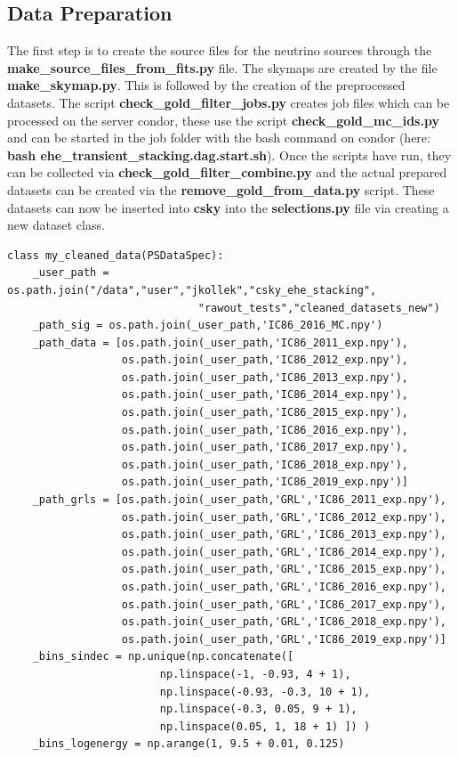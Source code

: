 \subsection{Data Preparation}
The first step is to create the source files for the neutrino sources through the \textbf{make\_source\_files\_from\_fits.py} file.
The skymaps are created by the file \textbf{make\_skymap.py}.
This is followed by the creation of the preprocessed datasets.
The script \textbf{check\_gold\_filter\_jobs.py} creates job files which can be processed on the server condor, these use the script \textbf{check\_gold\_mc\_ids.py} and can be started in the job folder with the bash command on condor (here: \textbf{bash ehe\_transient\_stacking.dag.start.sh}).
Once the scripts have run, they can be collected via \textbf{check\_gold\_filter\_combine.py} and the actual prepared datasets can be created via the \textbf{remove\_gold\_from\_data.py} script.
These datasets can now be inserted into \textbf{csky} into the \textbf{selections.py} file via creating a new dataset class.

\begin{verbatim}
class my_cleaned_data(PSDataSpec):
    _user_path = os.path.join("/data","user","jkollek","csky_ehe_stacking",
                              "rawout_tests","cleaned_datasets_new")
    _path_sig = os.path.join(_user_path,'IC86_2016_MC.npy')
    _path_data = [os.path.join(_user_path,'IC86_2011_exp.npy'),
                  os.path.join(_user_path,'IC86_2012_exp.npy'),
                  os.path.join(_user_path,'IC86_2013_exp.npy'),
                  os.path.join(_user_path,'IC86_2014_exp.npy'),
                  os.path.join(_user_path,'IC86_2015_exp.npy'),
                  os.path.join(_user_path,'IC86_2016_exp.npy'),
                  os.path.join(_user_path,'IC86_2017_exp.npy'),
                  os.path.join(_user_path,'IC86_2018_exp.npy'),
                  os.path.join(_user_path,'IC86_2019_exp.npy')]
    _path_grls = [os.path.join(_user_path,'GRL','IC86_2011_exp.npy'),
                  os.path.join(_user_path,'GRL','IC86_2012_exp.npy'),
                  os.path.join(_user_path,'GRL','IC86_2013_exp.npy'),
                  os.path.join(_user_path,'GRL','IC86_2014_exp.npy'),
                  os.path.join(_user_path,'GRL','IC86_2015_exp.npy'),
                  os.path.join(_user_path,'GRL','IC86_2016_exp.npy'),
                  os.path.join(_user_path,'GRL','IC86_2017_exp.npy'),
                  os.path.join(_user_path,'GRL','IC86_2018_exp.npy'),
                  os.path.join(_user_path,'GRL','IC86_2019_exp.npy')]
    _bins_sindec = np.unique(np.concatenate([
                        np.linspace(-1, -0.93, 4 + 1),
                        np.linspace(-0.93, -0.3, 10 + 1),
                        np.linspace(-0.3, 0.05, 9 + 1),
                        np.linspace(0.05, 1, 18 + 1) ]) )
    _bins_logenergy = np.arange(1, 9.5 + 0.01, 0.125)
\end{verbatim}

